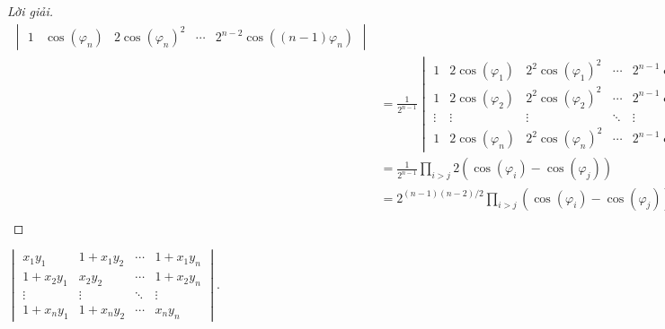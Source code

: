 \documentclass[class=nhvh-linear-algebra,crop=false]{standalone}
\begin{document}
\begin{proof}[Lời giải]
\begin{align*}
\begin{vmatrix}
			1      & \cos(\varphi_{n}) & 2{\cos(\varphi_{n})}^{2} & \cdots & 2^{n-2}\cos((n-1)\varphi_{n})
		\end{vmatrix}              \\
		 & = \frac{1}{2^{n-1}}
		\begin{vmatrix}
			1      & 2\cos(\varphi_{1}) & 2^{2}{\cos(\varphi_{1})}^{2} & \cdots & 2^{n-1}{\cos(\varphi_{1})}^{n-1} \\
			1      & 2\cos(\varphi_{2}) & 2^{2}{\cos(\varphi_{2})}^{2} & \cdots & 2^{n-1}{\cos(\varphi_{2})}^{n-2} \\
			\vdots & \vdots             & \vdots                       & \ddots & \vdots                           \\
			1      & 2\cos(\varphi_{n}) & 2^{2}{\cos(\varphi_{n})}^{2} & \cdots & 2^{n-1}{\cos(\varphi_{n})}^{n-1}
		\end{vmatrix} \\
		 & = \frac{1}{2^{n-1}}\prod_{i>j}2(\cos(\varphi_{i}) - \cos(\varphi_{j}))                                        \\
		 & = 2^{(n-1)(n-2)/2}\prod_{i>j}(\cos(\varphi_{i}) - \cos(\varphi_{j})).                                         \\
	\end{align*}
	\endgroup{}
\end{proof}

\begin{exercise}
	$\begin{vmatrix}
			x_{1}y_{1}     & 1 + x_{1}y_{2} & \cdots & 1 + x_{1}y_{n} \\
			1 + x_{2}y_{1} & x_{2}y_{2}     & \cdots & 1 + x_{2}y_{n} \\
			\vdots         & \vdots         & \ddots & \vdots         \\
			1 + x_{n}y_{1} & 1 + x_{n}y_{2} & \cdots & x_{n}y_{n}
		\end{vmatrix}$.
\end{exercise}
\end{document}
